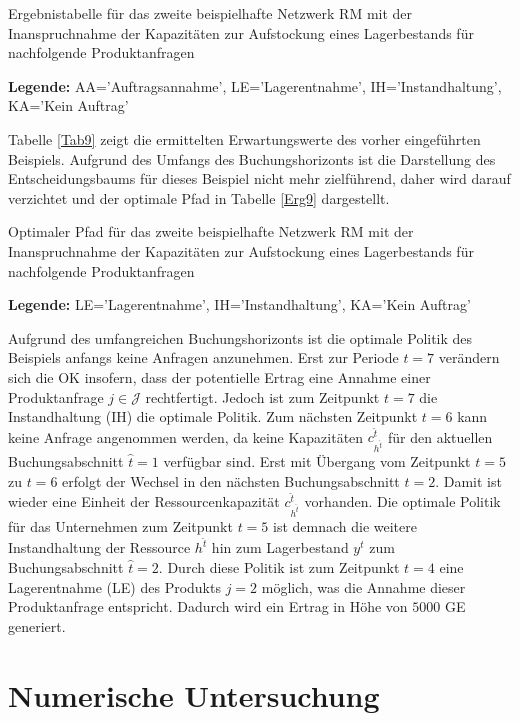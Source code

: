 \begin{table}
\begin{footnotesize}
    \caption{Ergebnistabelle für das zweite beispielhafte Netzwerk RM mit der Inanspruchnahme der Kapazitäten zur Aufstockung eines Lagerbestands für nachfolgende Produktanfragen} \label{Tab9}
    \vspace*{3mm}
        \begin{center}
      \end{center}
    \begin{center}
      {\footnotesize \textbf{Legende:} AA='Auftragsannahme', LE='Lagerentnahme', IH='Instandhaltung', KA='Kein Auftrag'} 
      \end{center}
\end{footnotesize}
\end{table}

Tabelle \ref{Tab9} zeigt die ermittelten Erwartungswerte des vorher eingeführten Beispiels. Aufgrund des Umfangs des Buchungshorizonts ist die Darstellung des Entscheidungsbaums für dieses Beispiel nicht mehr zielführend, daher wird darauf verzichtet und der optimale Pfad in Tabelle \ref{Erg9} dargestellt.

\begin{table}
\begin{footnotesize}
    \caption{Optimaler Pfad für das zweite beispielhafte Netzwerk RM mit der Inanspruchnahme der Kapazitäten zur Aufstockung eines Lagerbestands für nachfolgende Produktanfragen} \label{Erg9}
    \vspace*{3mm}
        \begin{center}
      \end{center}
    \begin{center}
      {\footnotesize \textbf{Legende:} LE='Lagerentnahme', IH='Instandhaltung', KA='Kein Auftrag'} 
      \end{center}
\end{footnotesize}
\end{table}

Aufgrund des umfangreichen Buchungshorizonts ist die optimale Politik des Beispiels anfangs keine Anfragen anzunehmen. Erst zur Periode $t=7$ verändern sich die OK insofern, dass der potentielle Ertrag eine Annahme einer Produktanfrage $j\in\mathcal{J}$ rechtfertigt. Jedoch ist zum Zeitpunkt $t=7$ die Instandhaltung (IH) die optimale Politik. Zum nächsten Zeitpunkt $t=6$ kann keine Anfrage angenommen werden, da keine Kapazitäten $c^{\hat{t}}_{h^{\hat{t}}}$ für den aktuellen Buchungsabschnitt $\hat{t}=1$ verfügbar sind. Erst mit Übergang vom Zeitpunkt $t=5$ zu $t=6$ erfolgt der Wechsel in den nächsten Buchungsabschnitt $\hat{t}=2$. Damit ist wieder eine Einheit der Ressourcenkapazität $c^{\hat{t}}_{h^{\hat{t}}}$ vorhanden. Die optimale Politik für das Unternehmen zum Zeitpunkt $t=5$ ist demnach die weitere Instandhaltung der Ressource $h^{\hat{t}}$ hin zum Lagerbestand $y^{\hat{t}}$ zum Buchungsabschnitt $\hat{t}=2$. Durch diese Politik ist zum Zeitpunkt $t=4$ eine Lagerentnahme (LE) des Produkts $j=2$ möglich, was die Annahme dieser Produktanfrage entspricht. Dadurch wird ein Ertrag in Höhe von $5000$ GE generiert.

\section{Numerische Untersuchung}\label{Untersuchung}